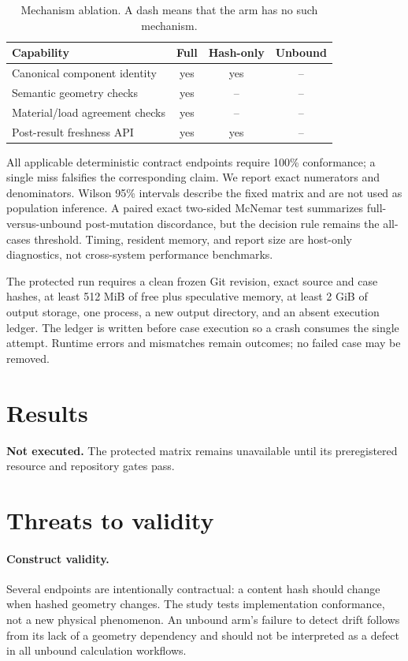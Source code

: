 \documentclass[10pt]{article}
\newcommand{\ResultSection}{\textbf{Not executed.} The protected matrix remains unavailable until its preregistered resource and repository gates pass.}
\begin{document}
\begin{table}[t]
\centering
\caption{Mechanism ablation. A dash means that the arm has no such mechanism.}
\label{tab:arms}
\begin{tabular}{@{}lccc@{}}
\toprule
Capability & Full & Hash-only & Unbound \\
\midrule
Canonical component identity & yes & yes & -- \\
Semantic geometry checks & yes & -- & -- \\
Material/load agreement checks & yes & -- & -- \\
Post-result freshness API & yes & yes & -- \\
\bottomrule
\end{tabular}
\end{table}

All applicable deterministic contract endpoints require 100\% conformance; a
single miss falsifies the corresponding claim. We report exact numerators and
denominators. Wilson 95\% intervals describe the fixed matrix and are not used
as population inference. A paired exact two-sided McNemar test summarizes
full-versus-unbound post-mutation discordance, but the decision rule remains
the all-cases threshold. Timing, resident memory, and report size are host-only
diagnostics, not cross-system performance benchmarks.

The protected run requires a clean frozen Git revision, exact source and case
hashes, at least 512 MiB of free plus speculative memory, at least 2 GiB of
output storage, one process, a new output directory, and an absent execution
ledger. The ledger is written before case execution so a crash consumes the
single attempt. Runtime errors and mismatches remain outcomes; no failed case
may be removed.

\FloatBarrier
\section{Results}

\begingroup
\small
\setlength{\tabcolsep}{4pt}
\ResultSection{}
\endgroup
\FloatBarrier

\section{Threats to validity}

\paragraph{Construct validity.}
Several endpoints are intentionally contractual: a content hash should change
when hashed geometry changes. The study tests implementation conformance, not a
new physical phenomenon. An unbound arm's failure to detect drift follows from
its lack of a geometry dependency and should not be interpreted as a defect in
all unbound calculation workflows.
\end{document}
